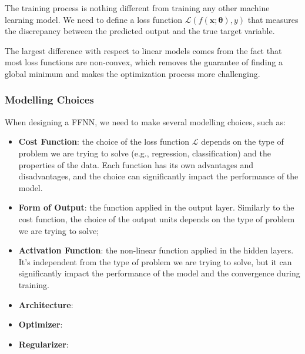 The training process is nothing different from training any other machine learning model.
We need to define a loss function $\mathcal{L}(f(\boldsymbol{x}; \boldsymbol{\theta}), y)$ that measures the discrepancy between the predicted output and the true target variable.

The largest difference with respect to linear models comes from the fact that most loss functions are non-convex, which removes the guarantee of finding a global minimum and makes the optimization process more challenging.

\subsubsection{Modelling Choices}
When designing a FFNN, we need to make several modelling choices, such as:
\begin{itemize}
    \item \textbf{Cost Function}: the choice of the loss function $\mathcal{L}$ depends on the type of problem we are trying to solve (e.g., regression, classification) and the properties of the data.
    Each function has its own advantages and disadvantages, and the choice can significantly impact the performance of the model.
    \item \textbf{Form of Output}: the function applied in the output layer. Similarly to the cost function, the choice of the output units depends on the type of problem we are trying to solve;
    \item \textbf{Activation Function}: the non-linear function applied in the hidden layers. It's independent from the type of problem we are trying to solve, but it can significantly impact the
    performance of the model and the convergence during training.
    \item \textbf{Architecture}: 
    \item \textbf{Optimizer}:
    \item \textbf{Regularizer}:
\end{itemize}